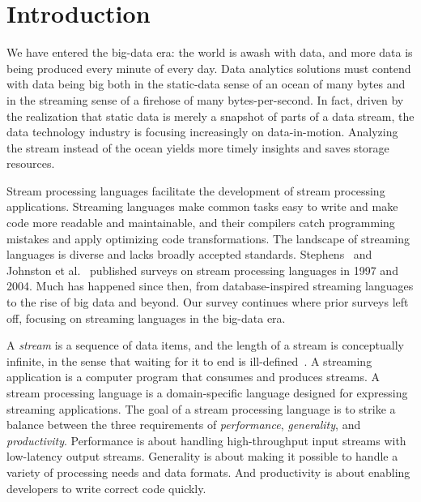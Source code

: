 \section{Introduction}\label{sec:introduction}

We have entered the big-data era: the world is awash with data, and
more data is being produced every minute of every day. Data analytics
solutions must contend with data being big both in the static-data sense of
an ocean of many bytes and in the streaming sense of a firehose of
many bytes-per-second. In fact, driven by the realization that static
data is merely a snapshot of parts of a data stream, the data technology
industry is focusing increasingly on data-in-motion. Analyzing
the stream instead of the ocean yields more timely insights and saves
storage resources.

Stream processing languages facilitate the development of stream
processing applications. Streaming languages make common tasks easy to
write and make code more readable and maintainable, and their
compilers catch programming mistakes and apply optimizing code
transformations. The landscape of streaming languages is diverse and
lacks broadly accepted standards.  Stephens~\cite{stephens_1997} and
Johnston et al.~\cite{johnston_hanna_millar_2004} published surveys on
stream processing languages in 1997 and 2004. Much has happened since
then, from database-inspired streaming languages to the rise of big
data and beyond. Our survey continues where prior surveys left off,
focusing on streaming languages in the big-data era.

A \emph{stream} is a sequence of data items, and the length of a
stream is conceptually infinite, in the sense that waiting for it to
end is ill-defined~\cite{muthukrishnan2005data}. A streaming application is a computer program that
consumes and produces streams. A stream processing language is a
domain-specific language designed for expressing streaming
applications. The goal of a stream processing language is to strike a
balance between the three requirements of \emph{performance}, \emph{generality}, and
\emph{productivity}. Performance is about handling high-throughput input
streams with low-latency output streams. Generality is about making it
possible to handle a variety of processing needs and data formats. And
productivity is about enabling developers to write correct code
quickly.

